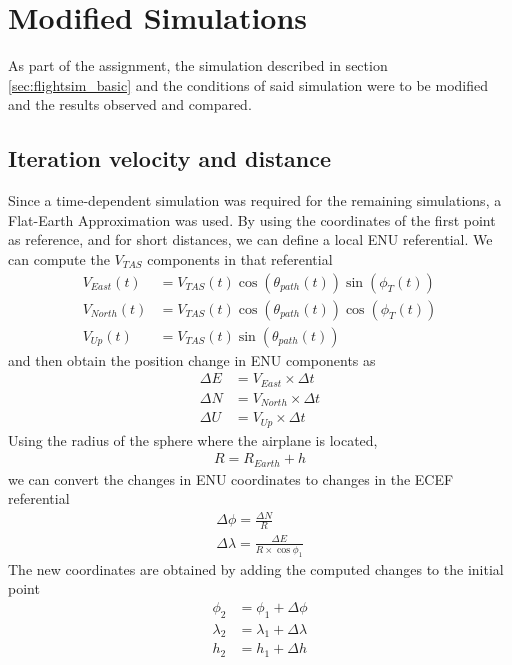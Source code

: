 \documentclass{article}
\begin{document}
\section{Modified Simulations}

As part of the assignment, the simulation described in section \ref{sec:flightsim_basic} and the conditions of said simulation were to be modified and the results observed and compared.

\subsection{Iteration velocity and distance}

Since a time-dependent simulation was required for the remaining simulations, a Flat-Earth Approximation was used. By using the coordinates of the first point as reference, and for short distances, we can define a local ENU referential. We can compute the $V_{TAS}$ components in that referential
\begin{align*}
    V_{East}(t) &= V_{TAS}(t)\cos\left(\theta_{path}(t)\right)\sin\left(\phi_T(t)\right) \\
    V_{North}(t) &= V_{TAS}(t)\cos\left(\theta_{path}(t)\right)\cos\left(\phi_T(t)\right) \\
    V_{Up}(t) &= V_{TAS}(t)\sin\left(\theta_{path}(t)\right)
\end{align*}
and then obtain the position change in ENU components as
\begin{align*}
    \Delta E &= V_{East} \times \Delta t \\
    \Delta N &= V_{North} \times \Delta t \\
    \Delta U &= V_{Up} \times \Delta t
\end{align*}
Using the radius of the sphere where the airplane is located, 
\begin{align*}
	R = R_{Earth} + h
\end{align*}
we can convert the changes in ENU coordinates to changes in the ECEF referential
\begin{gather*}
    \Delta \phi = \frac{\Delta N}{R} \\
    \Delta \lambda = \frac{\Delta E}{R \times \cos\phi_1}
\end{gather*}
The new coordinates are obtained by adding the computed changes to the initial point
\begin{align*}
    \phi_2 &= \phi_1 + \Delta \phi \\
    \lambda_2 &= \lambda_1 + \Delta \lambda \\
    h_2 &= h_1 + \Delta h
\end{align*}
\end{document}
